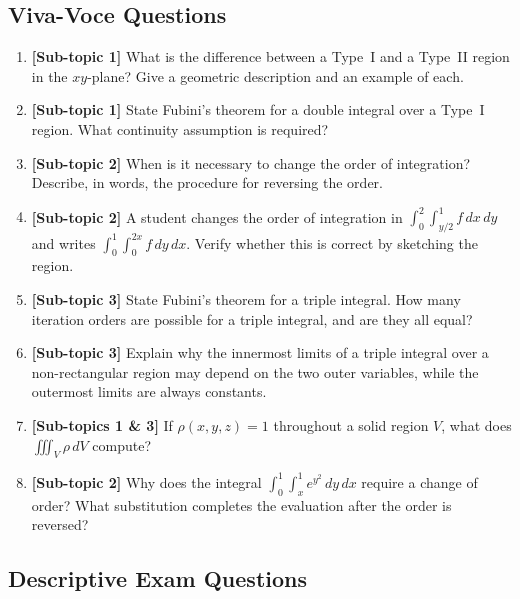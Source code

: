 \documentclass[12pt,a4paper]{article}
\begin{document}
\subsection*{Viva-Voce Questions}

\begin{enumerate}
  \item \textbf{[Sub-topic 1]} What is the difference between a Type~I and a Type~II region in the \(xy\)-plane? Give a geometric description and an example of each.

  \item \textbf{[Sub-topic 1]} State Fubini's theorem for a double integral over a Type~I region. What continuity assumption is required?

  \item \textbf{[Sub-topic 2]} When is it necessary to change the order of integration? Describe, in words, the procedure for reversing the order.

  \item \textbf{[Sub-topic 2]} A student changes the order of integration in \(\int_0^2\int_{y/2}^{1} f\,dx\,dy\) and writes \(\int_0^1\int_0^{2x} f\,dy\,dx\). Verify whether this is correct by sketching the region.

  \item \textbf{[Sub-topic 3]} State Fubini's theorem for a triple integral. How many iteration orders are possible for a triple integral, and are they all equal?

  \item \textbf{[Sub-topic 3]} Explain why the innermost limits of a triple integral over a non-rectangular region may depend on the two outer variables, while the outermost limits are always constants.

  \item \textbf{[Sub-topics 1 \& 3]} If \(\rho(x,y,z) = 1\) throughout a solid region \(V\), what does \(\iiint_V \rho\,dV\) compute?

  \item \textbf{[Sub-topic 2]} Why does the integral \(\int_0^1\int_x^1 e^{y^2}\,dy\,dx\) require a change of order? What substitution completes the evaluation after the order is reversed?
\end{enumerate}

\subsection*{Descriptive Exam Questions}
\end{document}
